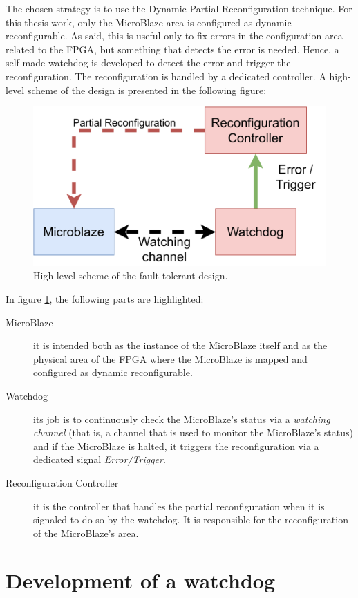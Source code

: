 The chosen strategy is to use the Dynamic Partial Reconfiguration technique. For this thesis work, only the MicroBlaze area is configured as dynamic reconfigurable. As said, this is useful only to fix errors in the configuration area related to the FPGA, but something that detects the error is needed. Hence, a self-made watchdog is developed to detect the error and trigger the reconfiguration. The reconfiguration is handled by a dedicated controller. A high-level scheme of the design is presented in the following figure:

\begin{figure}[H]
\centering
\includegraphics[width=0.8\linewidth]{images/chapter4/reconf_scheme.pdf}
\caption{High level scheme of the fault tolerant design.}
\label{fig:reconf_scheme}
\end{figure}

In figure \ref{fig:reconf_scheme}, the following parts are highlighted:
\begin{description}
    \item[MicroBlaze] it is intended both as the instance of the MicroBlaze itself and as the physical area of the FPGA where the MicroBlaze is mapped and configured as dynamic reconfigurable.
    \item[Watchdog] its job is to continuously check the MicroBlaze's status via a \textit{watching channel} (that is, a channel that is used to monitor the MicroBlaze's status) and if the MicroBlaze is halted, it triggers the reconfiguration via a dedicated signal \textit{Error/Trigger}.
    \item[Reconfiguration Controller] it is the controller that handles the partial reconfiguration when it is signaled to do so by the watchdog. It is responsible for the reconfiguration of the MicroBlaze's area.
\end{description}

\section{Development of a watchdog}

